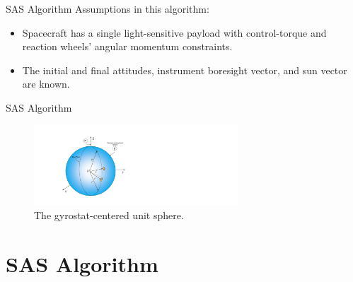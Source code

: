 \documentclass{beamer}
\begin{document}
\begin{frame}
\begin{block}{SAS Algorithm}	
	Assumptions in this algorithm: 
	\begin{itemize} 
		\item Spacecraft has a single light-sensitive payload with control-torque and reaction wheels' angular momentum constraints. 
		\item The initial and final attitudes, instrument boresight vector, and sun vector are known. 
	\end{itemize}
\end{block}
\end{frame}
\begin{frame}{SAS Algorithm}
\begin{block}{}
	\begin{figure}
		\includegraphics[width=3in]{./Figures/SASSchematic1}
		\caption{The gyrostat-centered unit sphere.}
	\end{figure}
\end{block}
\end{frame}
\section{SAS Algorithm}
\end{document}
